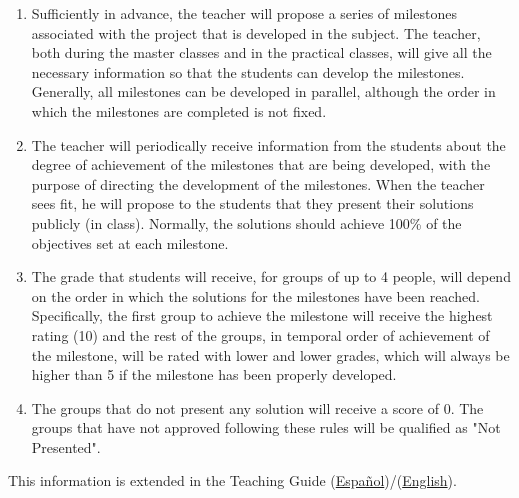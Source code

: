 \begin{enumerate}
\item Sufficiently in advance, the teacher will propose a series of
  milestones associated with the project that is developed in the
  subject. The teacher, both during the master classes and in the
  practical classes, will give all the necessary information so that
  the students can develop the milestones. Generally, all milestones
  can be developed in parallel, although the order in which the
  milestones are completed is not fixed.
\item The teacher will periodically receive information from the
  students about the degree of achievement of the milestones that are
  being developed, with the purpose of directing the development of
  the milestones. When the teacher sees fit, he will propose to the
  students that they present their solutions publicly (in
  class). Normally, the solutions should achieve 100\% of the
  objectives set at each milestone.
\item The grade that students will receive, for groups of up to 4
  people, will depend on the order in which the solutions for the
  milestones have been reached. Specifically, the first group to
  achieve the milestone will receive the highest rating (10) and the
  rest of the groups, in temporal order of achievement of the
  milestone, will be rated with lower and lower grades, which will
  always be higher than 5 if the milestone has been properly
  developed.
\item The groups that do not present any solution will receive a score
  of 0. The groups that have not approved following these rules will
  be qualified as "Not Presented".
\end{enumerate}

This information is extended in the Teaching Guide
(\href{https://portafirma.ual.es/pfirma/downloadReport/file?idDocument=4Jp82utmug&idRequest=QY36GYcOZQ}{Español})/(\href{https://portafirma.ual.es/pfirma/downloadReport/file?idDocument=Zcmom6qigD&idRequest=xXgueuk9oD}{English}).
